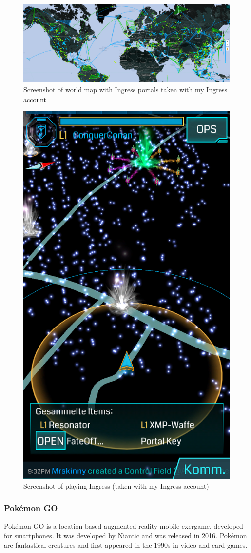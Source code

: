 \begin{figure}[bth]
  \centering
        \includegraphics[width=.95\linewidth]{gfx/ingress_map}
        \caption{Screenshot of world map with Ingress portals taken with my Ingress account}
        \label{fig:ingressMap}
\end{figure}
\begin{figure}[bth]
  \centering
        \includegraphics[width=.45\linewidth]{gfx/ingress_gameplay}
        \caption{Screenshot of playing Ingress (taken with my Ingress account)}
        \label{fig:ingressGameplay}
\end{figure}

\subsubsection{Pokémon GO}
Pokémon GO is a location-based augmented reality mobile exergame, developed for smartphones. It was developed by Niantic and was released in 2016. Pokémon are fantastical creatures and first appeared in the 1990s in video and card games.

